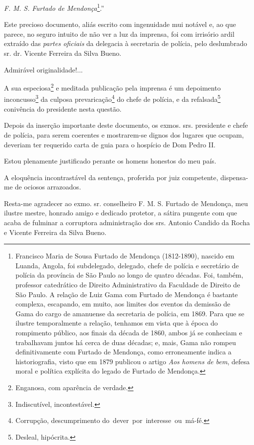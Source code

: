 \emph{F. M. S. Furtado de Mendonça}\footnote{Francisco Maria de Sousa
  Furtado de Mendonça (1812-1890), nascido em Luanda, Angola, foi
  subdelegado, delegado, chefe de polícia e secretário de polícia da
  província de São Paulo ao longo de quatro décadas. Foi, também,
  professor catedrático de Direito Administrativo da Faculdade de
  Direito de São Paulo. A relação de Luiz Gama com Furtado de Mendonça é
  bastante complexa, escapando, em muito, aos limites dos eventos da
  demissão de Gama do cargo de amanuense da secretaria de polícia, em
  1869. Para que se ilustre temporalmente a relação, tenhamos em vista
  que à época do rompimento público, aos finais da década de 1860, ambos
  já se conheciam e trabalhavam juntos há cerca de duas décadas; e,
  mais, Gama não rompeu definitivamente com Furtado de Mendonça, como
  erroneamente indica a historiografia, visto que em 1879 publicou o
  artigo \emph{Aos homens de bem}, defesa moral e política explícita do
  legado de Furtado de Mendonça.}.''

Este precioso documento, aliás escrito com ingenuidade mui notável e, ao
que parece, no seguro intuito de não ver a luz da imprensa, foi com
irrisório ardil extraído das \emph{partes oficiais} da delegacia à
secretaria de polícia, pelo deslumbrado sr. dr. Vicente Ferreira da
Silva Bueno.

Admirável originalidade!...

A sua especiosa\footnote{Enganosa, com aparência de verdade.} e
meditada publicação pela imprensa é um depoimento inconcusso\footnote{
  Indiscutível, incontestável.} da culposa prevaricação\footnote{
  Corrupção, descumprimento do~dever~por~interesse~ou~má-fé.} do chefe
de polícia, e da refalsada\footnote{Desleal, hipócrita.} conivência do
presidente nesta questão.

Depois da inserção importante deste documento, os exmos. srs. presidente
e chefe de polícia, para serem coerentes e mostrarem-se dignos dos
lugares que ocupam, deveriam ter requerido carta de guia para o hospício
de Dom Pedro II.

Estou plenamente justificado perante os homens honestos do meu país.

A eloquência incontrastável da sentença, proferida por juiz competente,
dispensa-me de ociosos arrazoados.

Resta-me agradecer ao exmo. sr. conselheiro F. M. S. Furtado de
Mendonça, meu ilustre mestre, honrado amigo e dedicado protetor, a
sátira pungente com que acaba de fulminar a corruptora administração dos
srs. Antonio Candido da Rocha e Vicente Ferreira da Silva Bueno.


